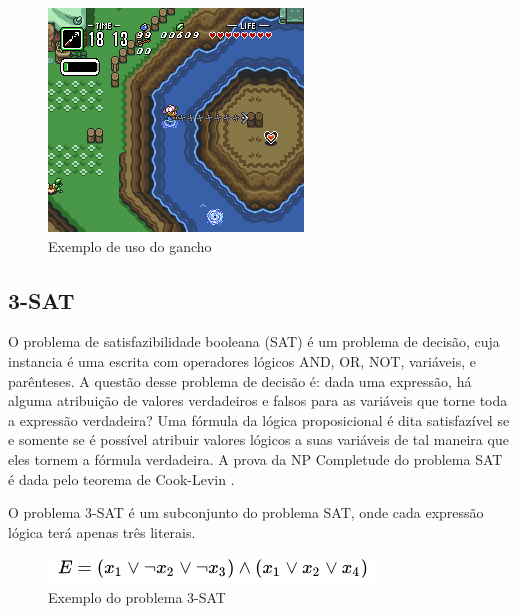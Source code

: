 \begin{figure}[!htb]
     \centering
     \includegraphics[scale=0.8]{hookshot.png}
     \caption{Exemplo de uso do gancho}
\end{figure}

\subsection{3-SAT}

O problema de satisfazibilidade booleana (SAT) é um problema de decisão, cuja instancia é uma escrita com operadores lógicos AND, OR, NOT, variáveis, e parênteses. A questão desse problema de decisão é: dada uma expressão, há alguma atribuição de valores verdadeiros e falsos para as variáveis que torne toda a expressão verdadeira? Uma fórmula da lógica proposicional é dita satisfazível se e somente se é possível atribuir valores lógicos a suas variáveis de tal maneira que eles tornem a fórmula verdadeira. A prova da NP Completude do problema SAT é dada pelo teorema de Cook-Levin \cite{cook1971complexity}.

O problema 3-SAT é um subconjunto do problema SAT, onde cada expressão lógica terá apenas três literais.

\begin{figure}[!htb]
     \centering
     \includegraphics[scale=0.8]{cook.png}
     \caption{Exemplo do problema 3-SAT}
\end{figure}